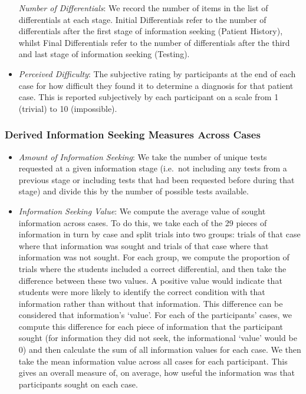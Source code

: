 \documentclass[a4paper, nobind]{templates/ociamthesis}
\begin{document}
\begin{itemize}
  \emph{Number of Differentials}: We record the number of items in the list of differentials at each stage. Initial Differentials refer to the number of differentials after the first stage of information seeking (Patient History), whilst Final Differentials refer to the number of differentials after the third and last stage of information seeking (Testing).
\item
  \emph{Perceived Difficulty}: The subjective rating by participants at the end of each case for how difficult they found it to determine a diagnosis for that patient case. This is reported subjectively by each participant on a scale from 1 (trivial) to 10 (impossible).
\end{itemize}

\hypertarget{derived-information-seeking-measures-across-cases}{%
\subsubsection{Derived Information Seeking Measures Across Cases}\label{derived-information-seeking-measures-across-cases}}

\begin{itemize}
\item
  \emph{Amount of Information Seeking}: We take the number of unique tests requested at a given information stage (i.e.~not including any tests from a previous stage or including tests that had been requested before during that stage) and divide this by the number of possible tests available.
\item
  \emph{Information Seeking Value}: We compute the average value of sought information across cases. To do this, we take each of the 29 pieces of information in turn by case and split trials into two groups: trials of that case where that information was sought and trials of that case where that information was not sought. For each group, we compute the proportion of trials where the students included a correct differential, and then take the difference between these two values. A positive value would indicate that students were more likely to identify the correct condition with that information rather than without that information. This difference can be considered that information's `value'. For each of the participants' cases, we compute this difference for each piece of information that the participant sought (for information they did not seek, the informational `value' would be 0) and then calculate the sum of all information values for each case. We then take the mean information value across all cases for each participant. This gives an overall measure of, on average, how useful the information was that participants sought on each case.
\end{itemize}
\end{document}
